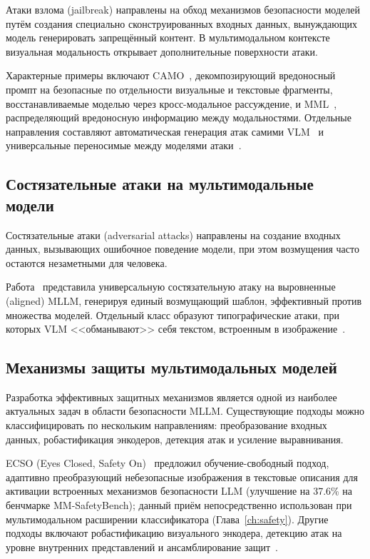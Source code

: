Атаки взлома (jailbreak) направлены на обход механизмов безопасности моделей путём создания специально сконструированных входных данных, вынуждающих модель генерировать запрещённый контент. В мультимодальном контексте визуальная модальность открывает дополнительные поверхности атаки.

Характерные примеры включают CAMO~\cite{2506.16760}, декомпозирующий вредоносный промпт на безопасные по отдельности визуальные и текстовые фрагменты, восстанавливаемые моделью через кросс-модальное рассуждение, и MML~\cite{2412.00473}, распределяющий вредоносную информацию между модальностями. Отдельные направления составляют автоматическая генерация атак самими VLM~\cite{2411.00827,2407.16686} и универсальные переносимые между моделями атаки~\cite{2602.01025}.

\subsection{Состязательные атаки на мультимодальные модели}\label{subsec:adversarial_attacks}

Состязательные атаки (adversarial attacks) направлены на создание входных данных, вызывающих ошибочное поведение модели, при этом возмущения часто остаются незаметными для человека.

Работа~\cite{2502.07987} представила универсальную состязательную атаку на выровненные (aligned) MLLM, генерируя единый возмущающий шаблон, эффективный против множества моделей. Отдельный класс образуют типографические атаки, при которых VLM <<обманывают>> себя текстом, встроенным в изображение~\cite{2402.00626}.

\subsection{Механизмы защиты мультимодальных моделей}\label{subsec:defense_mechanisms}

Разработка эффективных защитных механизмов является одной из наиболее актуальных задач в области безопасности MLLM. Существующие подходы можно классифицировать по нескольким направлениям: преобразование входных данных, робастификация энкодеров, детекция атак и усиление выравнивания.

ECSO (Eyes Closed, Safety On)~\cite{2403.09572} предложил обучение-свободный подход, адаптивно преобразующий небезопасные изображения в текстовые описания для активации встроенных механизмов безопасности LLM (улучшение на 37.6\% на бенчмарке MM-SafetyBench); данный приём непосредственно использован при мультимодальном расширении классификатора (Глава~\ref{ch:safety}). Другие подходы включают робастификацию визуального энкодера, детекцию атак на уровне внутренних представлений и ансамблирование защит~\cite{2502.14486}.


